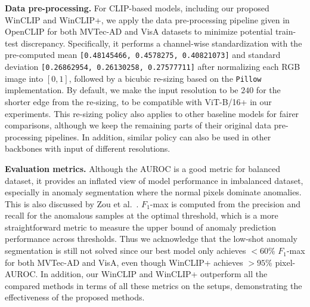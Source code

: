\vspace{0.05in}
\noindent\textbf{Data pre-processing. }
For CLIP-based models, including our proposed WinCLIP and WinCLIP+, we apply the data pre-processing pipeline given in OpenCLIP \cite{ilharco_gabriel_2021_5143773} for both MVTec-AD and VisA datasets to minimize potential train-test discrepancy. Specifically, it performs a channel-wise standardization with the pre-computed mean \texttt{[0.48145466, 0.4578275, 0.40821073]} and standard deviation \texttt{[0.26862954, 0.26130258, 0.27577711]} after normalizing each RGB image into $[0, 1]$, followed by a bicubic re-sizing based on the \verb|Pillow| implementation. By default, we make the input resolution to be $240$ for the shorter edge from the re-sizing, to be compatible with ViT-B/16+ in our experiments. This re-sizing policy also applies to other baseline models for fairer comparisons, although we keep the remaining parts of their original data pre-processing pipelines. In addition, similar policy can also be used in other backbones with input of different resolutions.

\vspace{0.05in}
\noindent\textbf{Evaluation metrics. }
Although the AUROC is a good metric for balanced dataset, it provides an inflated view of model performance in imbalanced dataset, especially in anomaly segmentation where the normal pixels dominate anomalies. This is also discussed by Zou et al.~\cite{zou2022spot}. $F_1$-max is computed from the precision and recall for the anomalous samples at the optimal threshold, which is a more straightforward metric to measure the upper bound of anomaly prediction performance across thresholds. Thus we acknowledge that the low-shot anomaly segmentation is still not solved since our best model only achieves $<60\%$ $F_1$-max for both MVTec-AD and VisA, even though WinCLIP+ achieves $>95\%$ pixel-AUROC. In addition, our WinCLIP and WinCLIP+ outperform all the compared methods in terms of all these metrics on the setups, demonstrating the effectiveness of the proposed methods.

